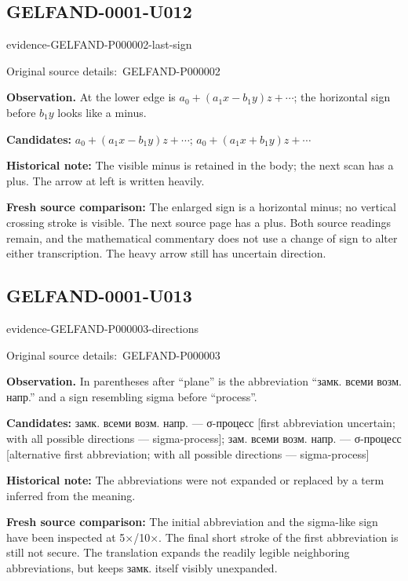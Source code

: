 \documentclass[11pt]{article}
\newcommand{\EvidenceBlock}[4]{%
 \par\smallskip\noindent\begin{minipage}{\linewidth}
 \begin{minipage}[t]{.47\linewidth}\vspace{0pt}\centering
 \csname evidence-#1-#2\endcsname\par
 {\scriptsize\SourceCropCaption\ #1}\par
 \end{minipage}\hfill
 \begin{minipage}[t]{.49\linewidth}\vspace{0pt}\raggedright
 {\small\color{orange!65!black}\textbf{#4} #3}\par
 \end{minipage}
 \end{minipage}\par\smallskip}
\newcommand{\SourceCropCaption}{Original source details:}\newcommand{\ReadingCaption}{Uncertain reading.}\newcommand{\IncompleteCaption}{Undeciphered passage.}\newcommand{\DiagramCaption}{Diagram and typed description.}
\begin{document}
\subsection*{GELFAND-0001-U012}
\EvidenceBlock{GELFAND-P000002}{last-sign}{At the lower edge is \(a_0+(a_1x-b_1y)z+\cdots\); the horizontal sign before \(b_1y\) looks like a minus.}{Observation.}
\par\smallskip\noindent\textbf{Candidates: } \(a_0+(a_1x-b_1y)z+\cdots\); \(a_0+(a_1x+b_1y)z+\cdots\)\par
\par\smallskip\noindent\textbf{Historical note: } The visible minus is retained in the body; the next scan has a plus. The arrow at left is written heavily.\par
\par\smallskip\noindent\textbf{Fresh source comparison: } The enlarged sign is a horizontal minus; no vertical crossing stroke is visible. The next source page has a plus. Both source readings remain, and the mathematical commentary does not use a change of sign to alter either transcription. The heavy arrow still has uncertain direction.\par

\subsection*{GELFAND-0001-U013}
\EvidenceBlock{GELFAND-P000003}{directions}{In parentheses after “plane” is the abbreviation “замк. всеми возм. напр.” and a sign resembling sigma before “process”.}{Observation.}
\par\smallskip\noindent\textbf{Candidates: } замк. всеми возм. напр. — σ-процесс [first abbreviation uncertain; with all possible directions — sigma-process]; зам. всеми возм. напр. — σ-процесс [alternative first abbreviation; with all possible directions — sigma-process]\par
\par\smallskip\noindent\textbf{Historical note: } The abbreviations were not expanded or replaced by a term inferred from the meaning.\par
\par\smallskip\noindent\textbf{Fresh source comparison: } The initial abbreviation and the sigma-like sign have been inspected at 5×/10×. The final short stroke of the first abbreviation is still not secure. The translation expands the readily legible neighboring abbreviations, but keeps замк. itself visibly unexpanded.\par
\end{document}
